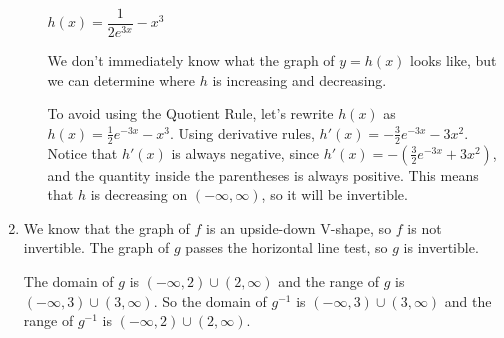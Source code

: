 \documentclass{article}
\newenvironment{enumeratecols}[2][]
{\NumTabs{#2}%
  \begin{enumerate*}[%
    itemjoin={\tab},#1]}%
  {\end{enumerate*}}
\begin{document}
\begin{enumerate}
\begin{enumerate}

      \begin{problem}
        $h(x) = \dfrac{1}{2 e^{3x}} - x^3$
      \end{problem}

      \begin{solution}
        We don't immediately know what the graph of $y=h(x)$ looks like,
        but we can determine where $h$ is increasing and decreasing.

        To avoid using the Quotient Rule, let's rewrite $h(x)$
        as $h(x)=\tfrac{1}{2}e^{-3x}-x^3$. Using derivative rules, 
        $h'(x)=-\tfrac{3}{2}e^{-3x}-3x^2$. Notice that $h'(x)$ is always negative,
        since $h'(x)=-(\tfrac{3}{2}e^{-3x}+3x^2)$, and the quantity
        inside the parentheses is always positive. This means that $h$ is decreasing
        on $(-\infty, \infty)$, so it will be invertible.
      \end{solution}

    \end{enumerate}

  \probonly{\end{multicols}}

  \pspace{\vfill}

\item 

  \begin{solution}
    We know that the graph of $f$ is an upside-down V-shape, so $f$ is not invertible.
    The graph of $g$ passes the horizontal line test, so $g$ is invertible.

    The domain of $g$ is $(-\infty, 2) \cup (2, \infty)$ and the range of $g$ is
    $(-\infty, 3) \cup (3, \infty)$. So the domain of $g^{-1}$ is
    $(-\infty, 3) \cup (3, \infty)$ and the range of $g^{-1}$ is 
    $(-\infty, 2) \cup (2, \infty)$.


\end{solution}
\end{enumerate}
\end{document}
